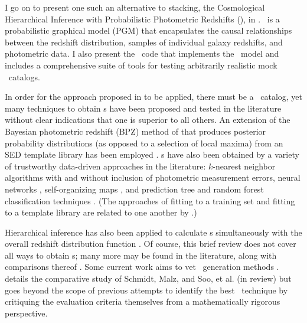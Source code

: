 I go on to present one such an alternative to stacking, the Cosmological Hierarchical Inference with Probabilistic Photometric Redshifts (\Chippr), in .
\Chippr\ is a probabilistic graphical model (PGM) that encapsulates the causal relationships between the redshift distribution, samples of individual galaxy redshifts, and photometric data.
I also present the \chippr\ code that implements the \Chippr\ model and includes a comprehensive suite of tools for testing arbitrarily realistic mock \pzpdf\ catalogs.

In order for the approach proposed in  to be applied, there must be a \pzpdf\ catalog, yet many techniques to obtain \pzpdf s have been proposed and tested in the literature without clear indications that one is superior to all others.  
An extension of the Bayesian photometric redshift (BPZ) method of \citet{Benitez2000} that produces posterior probability distributions (as opposed to a selection of local maxima) from an SED template library has been employed \citep{Hildebrandt2012, Kelly2014, Lopez-Sanjuan2015}.  
\Pzpdf s have also been obtained by a variety of trustworthy data-driven approaches in the literature: $k$-nearest neighbor algorithms with \citep{Ball2008} and without \citep{Sheldon2012} inclusion of photometric measurement errors, neural networks \citep{Bonnett2015a}, self-organizing maps \citep{CarrascoKind2014a}, and prediction tree and random forest classification techniques \citep{Carliles2010, CarrascoKind2013}.  
(The approaches of fitting to a training set and fitting to a template library are related to one another by \citet{Budavari2009}.)  

Hierarchical inference has also been applied to calculate \pzpdf s simultaneously with the overall redshift distribution function \citep{Leistedt2016}.  
Of course, this brief review does not cover all ways to obtain \pzpdf s; many more may be found in the literature, along with comparisons thereof \citep{Hildebrandt2010, Dahlen2013, Sanchez2013, Bonnett2015}.
Some current work aims to vet \pzpdf\ generation methods \citep{Wittman2016}.
 details the comparative study of Schmidt, Malz, and Soo, et al. (in review) but goes beyond the scope of previous attempts to identify the best \pzpdf\ technique by critiquing the evaluation criteria themselves from a mathematically rigorous perspective.

